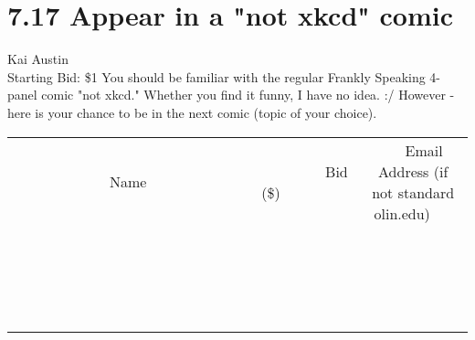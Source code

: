 \documentclass[11pt]{article}
\begin{document}
\section*{7.17 Appear in a "not xkcd" comic}
Kai Austin
\\
Starting Bid: \$1
\newline
You should be familiar with the regular Frankly Speaking 4-panel comic "not xkcd." Whether you find it funny, I have no idea. :/ However - here is your chance to be in the next comic (topic of your choice).
\\[3ex]
\begin{tabular}{c c c}
~~~~~~~~~~~~~Name~~~~~~~~~~~~~ & ~~~~~~~~~Bid (\$)~~~~~~~~~  & ~~~Email Address (if not standard olin.edu)~~~\\
 & & \\
\hline
 & & \\
\hline
 & & \\
\hline
 & & \\
\hline
 & & \\
\hline
 & & \\
\hline
 & & \\
\hline
 & & \\
\hline
 & & \\
\hline
 & & \\
\hline
 & & \\
\hline
 & & \\
\hline
 & & \\
\hline
 & & \\
\hline
 & & \\
\hline
 & & \\
\hline
 & & \\
\hline
 & & \\
\hline
 & & \\
\hline
\end{tabular}
\newpage
\end{document}
